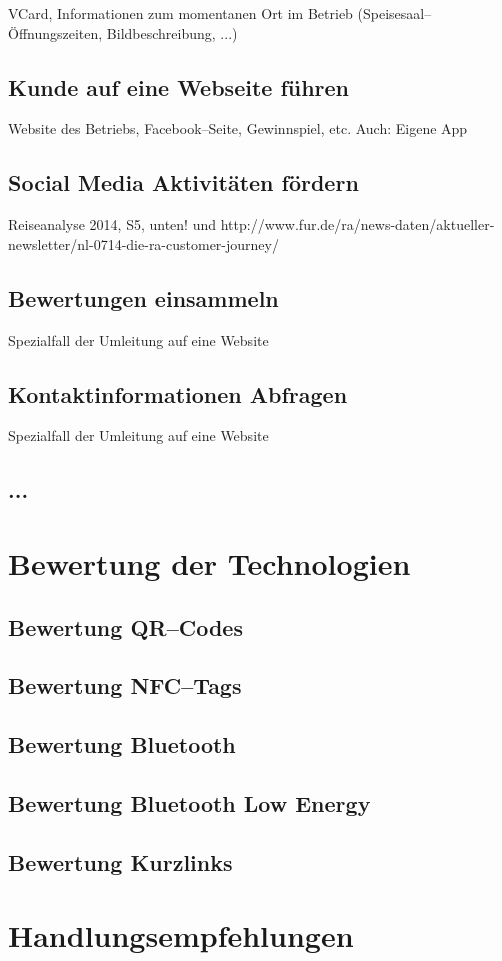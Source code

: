 VCard, Informationen zum momentanen Ort im Betrieb (Speisesaal--Öffnungszeiten, Bildbeschreibung, ...)

\subsection{Kunde auf eine Webseite führen}
Website des Betriebs, Facebook--Seite, Gewinnspiel, etc.
Auch: Eigene App

\subsection{Social Media Aktivitäten fördern}
Reiseanalyse 2014, S5, unten! und http://www.fur.de/ra/news-daten/aktueller-newsletter/nl-0714-die-ra-customer-journey/ 

\subsection{Bewertungen einsammeln}
Spezialfall der Umleitung auf eine Website

\subsection{Kontaktinformationen Abfragen}
Spezialfall der Umleitung auf eine Website

\subsection{...}

\section{Bewertung der Technologien}
\label{sec:bewertung}

\subsection{Bewertung QR–Codes}
\subsection{Bewertung NFC--Tags}
\subsection{Bewertung Bluetooth}
\subsection{Bewertung Bluetooth Low Energy}
\subsection{Bewertung Kurzlinks}




\section{Handlungsempfehlungen}
\label{sec:handlungsempfehlungen}
